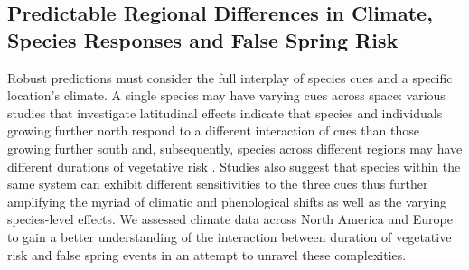 \documentclass{article}\usepackage[]{graphicx}\usepackage[]{color}
\begin{document}



\subsection {Predictable Regional Differences in Climate, Species Responses and False Spring Risk}
Robust predictions must consider the full interplay of species cues and a specific location's climate. A single species may have varying cues across space: various studies that investigate latitudinal effects indicate that species and individuals growing further north respond to a different interaction of cues than those growing further south and, subsequently, species across different regions may have different durations of vegetative risk \citep {Partanen2004, Viheraaarnio2006, Caffarra2011}. Studies also suggest that species within the same system can exhibit different sensitivities to the three cues \citep{Basler2012, Laube2013} thus further amplifying the myriad of climatic and phenological shifts as well as the varying species-level effects.  We assessed climate data across North America and Europe to gain a better understanding of the interaction between duration of vegetative risk and false spring events in an attempt to unravel these complexities.
\end{document}
